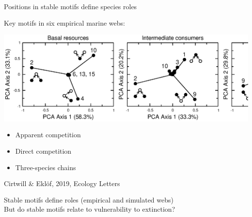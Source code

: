 \documentclass{beamer}
\begin{document}
  \begin{frame}{Positions in stable motifs define species roles}

    \begin{block}{Key motifs in six empirical marine webs:}

    \begin{centering}

      \includegraphics[width=\textwidth]{Eklof_figs/PCA_positions.eps}

    \end{centering}

    \begin{itemize}
      \item Apparent competition
      \item Direct competition
      \item Three-species chains
    \end{itemize}
    \end{block}
    \vspace{-0.5cm}
    {\tiny Cirtwill \& Ekl\"{o}f, 2019, Ecology Letters}

    {\color{white}Stable motifs define roles (empirical and simulated webs)}\\
    {\color{white}But do stable motifs relate to vulnerability to extinction?}

    \end{frame}
\end{document}
